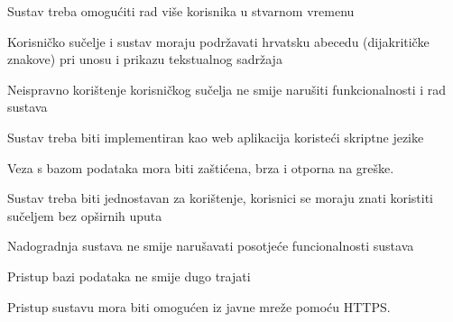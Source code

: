 %		 
%			 

		\begin{packed_item}
		
			\item Sustav treba omogućiti rad više korisnika u stvarnom vremenu
			\item 	Korisničko sučelje i sustav moraju podržavati hrvatsku abecedu (dijakritičke znakove) pri unosu i prikazu tekstualnog sadržaja
			\item Neispravno korištenje korisničkog sučelja ne smije narušiti funkcionalnosti i rad sustava
			\item Sustav treba biti implementiran kao web aplikacija koristeći skriptne jezike
			\item Veza s bazom podataka mora biti zaštićena, brza i otporna na greške.
			\item Sustav treba biti jednostavan za korištenje, korisnici se moraju znati koristiti sučeljem bez opširnih uputa
			\item Nadogradnja sustava ne smije narušavati posotjeće funcionalnosti sustava
			\item Pristup bazi podataka ne smije dugo trajati
			\item Pristup sustavu mora biti omogućen iz javne mreže pomoću HTTPS.
		
		\end{packed_item}
			 
			 
	
